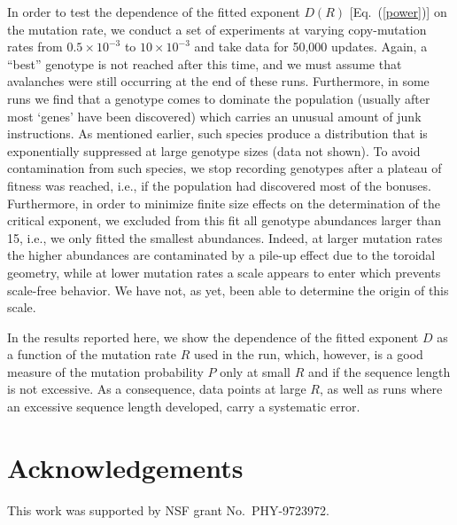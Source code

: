 \documentclass[letterpaper]{article}
\begin{document}
In order to test the dependence of the fitted exponent $D(R)$
[Eq.~(\ref{power})] on the mutation rate, we conduct a set of
experiments at varying copy-mutation rates from $0.5\times10^{-3}$ to
$10\times10^{-3}$ and take data for 50,000 updates. Again, a ``best''
genotype is not reached after this time, and we must assume that
avalanches were still occurring at the end of these runs. Furthermore,
in some runs we find that a genotype comes to dominate the population
(usually after most `genes' have been discovered) which carries an
unusual amount of junk instructions. As mentioned earlier, such
species produce a distribution that is exponentially suppressed at
large genotype sizes (data not shown). To avoid contamination from
such species, we stop recording genotypes after a plateau of fitness
was reached, i.e., if the population had discovered most of the
bonuses. Furthermore, in order to minimize finite size effects on the
determination of the critical exponent, we excluded from this fit all
genotype abundances larger than 15, i.e., we only fitted the smallest
abundances. Indeed, at larger mutation rates the higher abundances are
contaminated by a pile-up effect due to the toroidal geometry, while
at lower mutation rates a scale appears to enter which prevents
scale-free behavior. We have not, as yet, been able to determine the
origin of this scale.

In the results reported here, we show the dependence of the fitted
exponent $D$ as a function of the mutation rate $R$ used in the run,
which, however, is a good measure of the mutation probability $P$ only
at small $R$ and if the sequence length is not excessive. As a
consequence, data points at large $R$, as well as runs where an
excessive sequence length developed, carry a systematic error.

\section{Acknowledgements}

This work was supported by NSF grant No.\ PHY-9723972.

\footnotesize

\end{document}
